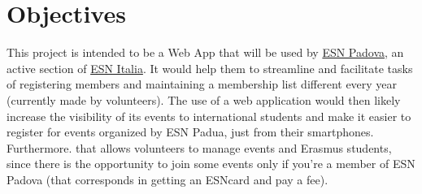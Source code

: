 \section{Objectives}

This project is intended to be a Web App that will be used by
\href{https://padova.esn.it/}{ESN Padova}, an active section of \href{https://esn.it/}{ESN Italia}.
It would help them to streamline and facilitate tasks of
registering members and maintaining a membership list different every year (currently made by volunteers).
The use of a web application would then likely increase the visibility of its events to international students
and make it easier to register for events organized by ESN Padua, just from their smartphones.\\
Furthermore. that allows volunteers to
manage events and Erasmus students, since there is the opportunity to join some events
only if you’re a member of ESN Padova (that corresponds in getting an ESNcard and pay a fee).
